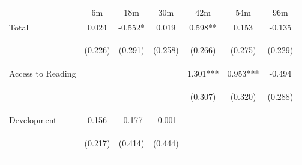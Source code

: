 \begin{tabular}{lcccccc}
\hline \noalign{\smallskip} & 6m & 18m & 30m & 42m & 54m & 96m\\
\noalign{\smallskip}\hline \noalign{\smallskip}Total & 0.024 & -0.552* & 0.019 & 0.598** & 0.153 & -0.135\\
 & \begin{footnotesize}(0.226)\end{footnotesize} & \begin{footnotesize}(0.291)\end{footnotesize} & \begin{footnotesize}(0.258)\end{footnotesize} & \begin{footnotesize}(0.266)\end{footnotesize} & \begin{footnotesize}(0.275)\end{footnotesize} & \begin{footnotesize}(0.229)\end{footnotesize}\\
\noalign{\smallskip}Access to Reading &  &  &  & 1.301*** & 0.953*** & -0.494\\
 & \begin{footnotesize}\end{footnotesize} & \begin{footnotesize}\end{footnotesize} & \begin{footnotesize}\end{footnotesize} & \begin{footnotesize}(0.307)\end{footnotesize} & \begin{footnotesize}(0.320)\end{footnotesize} & \begin{footnotesize}(0.288)\end{footnotesize}\\
\noalign{\smallskip}Development & 0.156 & -0.177 & -0.001 &  &  & \\
 & \begin{footnotesize}(0.217)\end{footnotesize} & \begin{footnotesize}(0.414)\end{footnotesize} & \begin{footnotesize}(0.444)\end{footnotesize} & \begin{footnotesize}\end{footnotesize} & \begin{footnotesize}\end{footnotesize} & \begin{footnotesize}\end{footnotesize}\\

\end{tabular}
